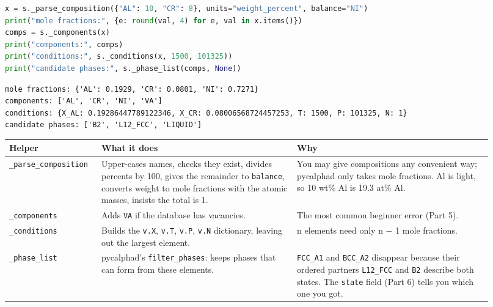\documentclass[12pt,a4paper]{article}
\begin{document}
\begin{lstlisting}[basicstyle={\footnotesize\ttfamily},language=Python]
x = s._parse_composition({"AL": 10, "CR": 8}, units="weight_percent", balance="NI")
print("mole fractions:", {e: round(val, 4) for e, val in x.items()})
comps = s._components(x)
print("components:", comps)
print("conditions:", s._conditions(x, 1500, 101325))
print("candidate phases:", s._phase_list(comps, None))
\end{lstlisting}
\begin{lstlisting}[basicstyle={\scriptsize\ttfamily}]
mole fractions: {'AL': 0.1929, 'CR': 0.0801, 'NI': 0.7271}
components: ['AL', 'CR', 'NI', 'VA']
conditions: {X_AL: 0.19286447789122346, X_CR: 0.08006568724457253, T: 1500, P: 101325, N: 1}
candidate phases: ['B2', 'L12_FCC', 'LIQUID']
\end{lstlisting}
\begingroup\small
\begin{longtable}{>{\raggedright\arraybackslash}p{0.161\linewidth}>{\raggedright\arraybackslash}p{0.380\linewidth}>{\raggedright\arraybackslash}p{0.380\linewidth}}
\toprule
\textbf{Helper} & \textbf{What it does} & \textbf{Why} \\
\midrule
\endhead
\texttt{\_\allowbreak{}parse\_\allowbreak{}composition} & Upper-cases names, checks they exist, divides percents by 100, gives the remainder to \texttt{balance}, converts weight to mole fractions with the atomic masses, insists the total is 1. & You may give compositions any convenient way; pycalphad only takes mole fractions. Al is light, so 10 wt\% Al is 19.3 at\% Al. \\
\texttt{\_\allowbreak{}components} & Adds \texttt{VA} if the database has vacancies. & The most common beginner error (Part 5). \\
\texttt{\_\allowbreak{}conditions} & Builds the \texttt{v.\allowbreak{}X}, \texttt{v.\allowbreak{}T}, \texttt{v.\allowbreak{}P}, \texttt{v.\allowbreak{}N} dictionary, leaving out the largest element. & n elements need only n \(-\) 1 mole fractions. \\
\texttt{\_\allowbreak{}phase\_\allowbreak{}list} & pycalphad's \texttt{filter\_\allowbreak{}phases}: keeps phases that can form from these elements. & \texttt{FCC\_\allowbreak{}A1} and \texttt{BCC\_\allowbreak{}A2} disappear because their ordered partners \texttt{L12\_\allowbreak{}FCC} and \texttt{B2} describe both states. The \texttt{state} field (Part 6) tells you which one you got. \\
\bottomrule
\end{longtable}
\endgroup
\end{document}
